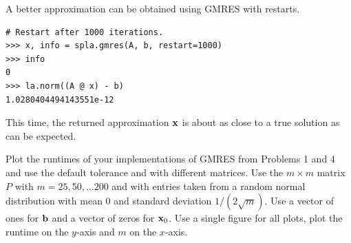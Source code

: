 A better approximation can be obtained using GMRES with restarts.
\newpage
\begin{lstlisting}
# Restart after 1000 iterations.
>>> x, info = spla.gmres(A, b, restart=1000)
>>> info
0
>>> la.norm((A @ x) - b)
1.0280404494143551e-12
\end{lstlisting}
This time, the returned approximation $\mathbf{x}$ is about as close to a true solution as can be expected.

\begin{problem}
Plot the runtimes of your implementations of GMRES from Problems 1 and 4 and  use the default tolerance and  with different matrices.
Use the $m \times m$ matrix $P$ with $m=25,50,\dots 200$ and with entries taken from a random normal distribution with mean 0 and standard deviation $1/(2\sqrt{m})$.
Use a vector of ones for $\mathbf{b}$ and a vector of zeros for $\mathbf{x}_0$.
Use a single figure for all plots, plot the runtime on the $y$-axis and $m$ on the $x$-axis.
\end{problem}

